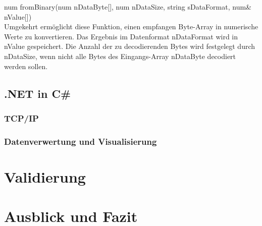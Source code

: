 \documentclass[ a4paper,
                oneside,
                toc=bibliography,
                toc=listof
                ]{scrbook}
\begin{document}
	num fromBinary(num nDataByte[], num nDataSize, string sDataFormat, num\& nValue[])\\
	Umgekehrt ermöglicht diese Funktion, einen empfangen Byte-Array in numerische Werte zu konvertieren. Das Ergebnis im Datenformat nDataFormat wird in nValue gespeichert. Die Anzahl der zu decodierenden Bytes wird festgelegt durch nDataSize, wenn nicht alle Bytes des Eingangs-Array nDataByte decodiert werden sollen.
	
	\section{.NET in C\#}
	
	
	\subsection{TCP/IP}
	
   	\subsection{Datenverwertung und Visualisierung}
   	
   	
   	\chapter{Validierung}
   	
   	\chapter{Ausblick und Fazit}
   	
   	\backmatter
   	
   	
   	\cleardoublepage
   	\listoffigures
   	\cleardoublepage
   	\listoftables
   	\cleardoublepage
   	
   	\cleardoublepage
   	\printbibliography
   	
   
\end{document}
